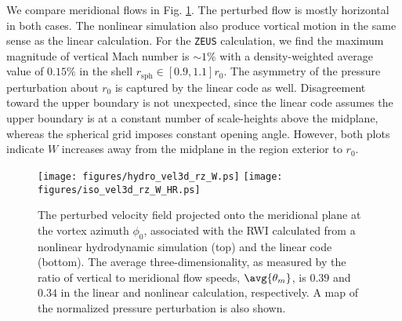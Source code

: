 We compare meridional flows in Fig. \ref{lin_nonlin_rz}. The perturbed flow
is mostly horizontal in both cases.   
The nonlinear simulation also produce vortical motion in the same sense as
the linear calculation. For the \texttt{ZEUS} calculation, 
  we find the maximum magnitude of 
  vertical Mach number is $\sim 1\%$ with a density-weighted average
  value of $0.15\%$ in the shell $r_\mathrm{sph}\in[0.9,1.1]r_0$. 
The asymmetry of the pressure perturbation
about $r_0$ is captured by the linear code as well. Disagreement toward
the upper boundary is not unexpected, since the linear code assumes
the upper boundary is at a constant number of scale-heights above the
midplane, whereas the spherical grid imposes constant opening angle. 
However, both plots indicate $W$ increases away from the midplane in
the region exterior to $r_0$.  


\begin{figure}[!t]
  \centering
  \texttt{[image: figures/hydro\_vel3d\_rz\_W.ps]}
  \texttt{[image: figures/iso\_vel3d\_rz\_W\_HR.ps]}
  \caption{The perturbed velocity field projected onto the meridional
    plane at the vortex azimuth $\phi_0$, associated with the RWI
    calculated from a nonlinear hydrodynamic simulation (top) and the
    linear code (bottom). The average three-dimensionality, as
      measured by the ratio of vertical to meridional flow speeds,
      $\avg{\theta_m}$, is $0.39$ and $0.34$ in the linear and 
      nonlinear calculation, respectively. 
    A map of the normalized pressure
    perturbation is also shown. 
  \label{lin_nonlin_rz}}
\end{figure}






